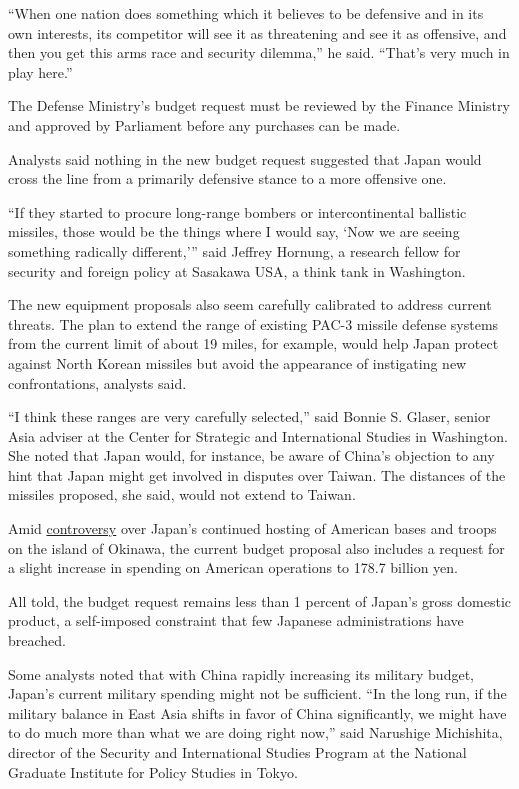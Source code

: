 ``When one nation does something which it believes to be defensive and
in its own interests, its competitor will see it as threatening and see
it as offensive, and then you get this arms race and security dilemma,''
he said. ``That's very much in play here.''

The Defense Ministry's budget request must be reviewed by the Finance
Ministry and approved by Parliament before any purchases can be made.

Analysts said nothing in the new budget request suggested that Japan
would cross the line from a primarily defensive stance to a more
offensive one.

``If they started to procure long-range bombers or intercontinental
ballistic missiles, those would be the things where I would say, `Now we
are seeing something radically different,''' said Jeffrey Hornung, a
research fellow for security and foreign policy at Sasakawa USA, a think
tank in Washington.

The new equipment proposals also seem carefully calibrated to address
current threats. The plan to extend the range of existing PAC-3 missile
defense systems from the current limit of about 19 miles, for example,
would help Japan protect against North Korean missiles but avoid the
appearance of instigating new confrontations, analysts said.

``I think these ranges are very carefully selected,'' said Bonnie S.
Glaser, senior Asia adviser at the Center for Strategic and
International Studies in Washington. She noted that Japan would, for
instance, be aware of China's objection to any hint that Japan might get
involved in disputes over Taiwan. The distances of the missiles
proposed, she said, would not extend to Taiwan.

Amid
\href{http://www.nytimes3xbfgragh.onion/2016/06/05/world/asia/okinawa-murder-case-heightens-outcry-over-us-militarys-presence.html}{controversy}
over Japan's continued hosting of American bases and troops on the
island of Okinawa, the current budget proposal also includes a request
for a slight increase in spending on American operations to 178.7
billion yen.

All told, the budget request remains less than 1 percent of Japan's
gross domestic product, a self-imposed constraint that few Japanese
administrations have breached.

Some analysts noted that with China rapidly increasing its military
budget, Japan's current military spending might not be sufficient. ``In
the long run, if the military balance in East Asia shifts in favor of
China significantly, we might have to do much more than what we are
doing right now,'' said Narushige Michishita, director of the Security
and International Studies Program at the National Graduate Institute for
Policy Studies in Tokyo.

